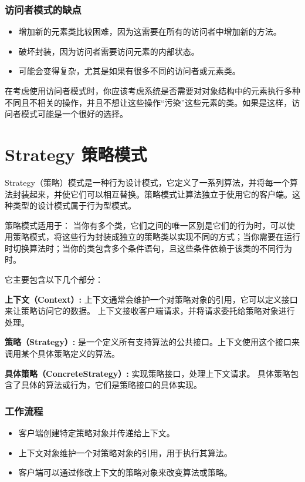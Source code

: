 \subsubsection{访问者模式的缺点}

\begin{itemize}
	\item 增加新的元素类比较困难，因为这需要在所有的访问者中增加新的方法。
	\item 破坏封装，因为访问者需要访问元素的内部状态。
	\item 可能会变得复杂，尤其是如果有很多不同的访问者或元素类。
\end{itemize}

在考虑使用访问者模式时，你应该考虑系统是否需要对对象结构中的元素执行多种不同且不相关的操作，并且不想让这些操作“污染”这些元素的类。如果是这样，访问者模式可能是一个很好的选择。

\section{Strategy 策略模式}

Strategy（策略）模式是一种行为设计模式，它定义了一系列算法，并将每一个算法封装起来，并使它们可以相互替换。策略模式让算法独立于使用它的客户端。这种类型的设计模式属于行为型模式。

策略模式适用于：
当你有多个类，它们之间的唯一区别是它们的行为时，可以使用策略模式，将这些行为封装成独立的策略类以实现不同的方式；当你需要在运行时切换算法时；当你的类包含多个条件语句，且这些条件依赖于该类的不同行为时。

它主要包含以下几个部分：

\textbf{上下文（Context）:}
上下文通常会维护一个对策略对象的引用，它可以定义接口来让策略访问它的数据。
上下文接收客户端请求，并将请求委托给策略对象进行处理。

\textbf{策略（Strategy）:}
是一个定义所有支持算法的公共接口。上下文使用这个接口来调用某个具体策略定义的算法。

\textbf{具体策略（ConcreteStrategy）:}
实现策略接口，处理上下文请求。
具体策略包含了具体的算法或行为，它们是策略接口的具体实现。

\subsubsection{工作流程}

\begin{itemize}
	\item 客户端创建特定策略对象并传递给上下文。
	\item 上下文对象维护一个对策略对象的引用，用于执行其算法。
	\item 客户端可以通过修改上下文的策略对象来改变算法或策略。
\end{itemize}

